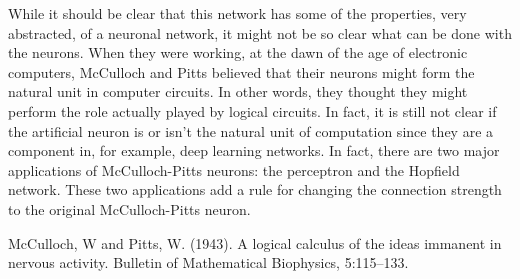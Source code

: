 \documentclass[12pt]{article}
\begin{document}
While it should be clear that this network has some of the properties,
very abstracted, of a neuronal network, it might not be so clear what
can be done with the neurons. When they were working, at the dawn of
the age of electronic computers, McCulloch and Pitts believed that
their neurons might form the natural unit in computer circuits. In
other words, they thought they might perform the role actually played
by logical circuits. In fact, it is still not clear if the artificial
neuron is or isn't the natural unit of computation since they are a
component in, for example, deep learning networks. In fact, there are
two major applications of McCulloch-Pitts neurons: the perceptron and
the Hopfield network. These two applications add a rule for changing
the connection strength to the original McCulloch-Pitts neuron.

\begin{thebibliography}{10}

McCulloch, W and Pitts, W. (1943). A logical calculus of the ideas immanent in nervous activity. 
\newblock Bulletin of Mathematical Biophysics, 5:115--133. 

\end{thebibliography}
\end{document}
